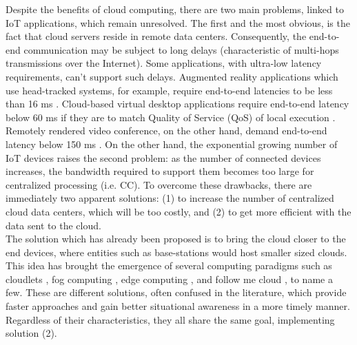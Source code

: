 \noindent\tab Despite the benefits of cloud computing, there are two main problems, linked to IoT applications, which remain unresolved. The first and the most obvious, is the fact that cloud servers reside in remote data centers. Consequently, the end-to-end communication may be subject to long delays (characteristic of multi-hops transmissions over the Internet). Some applications, with ultra-low latency requirements, can't support such delays. Augmented reality applications which use head-tracked systems, for example, require end-to-end latencies to be less than 16 ms \cite{ellis2004generalizeability}. Cloud-based virtual desktop applications require end-to-end latency below 60 ms if they are to match Quality of Service (QoS) of local execution \cite{taylor2015virtual}. Remotely rendered video conference, on the other hand, demand end-to-end latency below 150 ms \cite{szigeti2005end}. On the other hand, the exponential growing number of IoT devices raises the second problem: as the number of connected devices increases, the bandwidth required to support them becomes too large for centralized processing (i.e. CC). To overcome these drawbacks, there are immediately two apparent solutions: (1) to increase the number of centralized cloud data centers, which will be too costly, and (2) to get more efficient with the data sent to the cloud.\\
\noindent\tab The solution which has already been proposed is to bring the cloud closer to the end devices, where entities such as base-stations would host smaller sized clouds. This idea has brought the emergence of several computing paradigms such as cloudlets \cite{satyanarayanan2013cloudlets}, fog computing \cite{bonomi2012fog}, edge computing \cite{davy2014challenges}, and follow me cloud \cite{taleb2013follow}, to name a few. These are different solutions, often confused in the literature, which provide faster approaches and gain better situational awareness in a more timely manner. Regardless of their characteristics, they all share the same goal, implementing solution (2).\\
